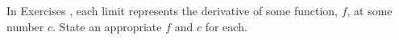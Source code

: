 {\noindent In Exercises}
{, each limit represents the derivative of some function, $f$, at some number $c$. State an appropriate $f$ and $c$ for each.
}
